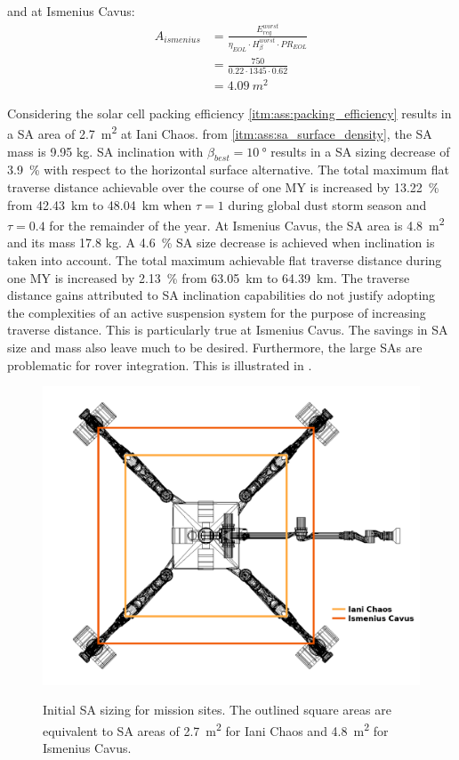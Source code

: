 and at Ismenius Cavus:
\begin{align}
  \label{calc:solar_cell_area_ismenius_cavus_traverse}
  A_{ismenius} &= \frac{E_{req}^{worst}}{\eta_{EOL} \cdot H_{\beta}^{worst} \cdot PR_{EOL}}\\
               &= \frac{750}{0.22 \cdot 1345 \cdot 0.62}\\
               &= \SI{4.09}{m^{2}}
\end{align}

Considering the solar cell packing efficiency \ref{itm:ass:packing_efficiency} results in a \ac{SA} area of \SI{2.7}{m^{2}} at Iani Chaos. from \ref{itm:ass:sa_surface_density}, the \ac{SA} mass is 9.95 \si{\kilo\gram}. \ac{SA} inclination with $\beta_{best} = \SI{10}{\degree}$ results in a \ac{SA} sizing decrease of \SI{3.9}{\percent} with respect to the horizontal surface alternative. The total maximum flat traverse distance achievable over the course of one \ac{MY} is increased by \SI{13.22}{\percent} from \SI{42.43}{\kilo\meter} to \SI{48.04}{\kilo\meter} when $\tau = 1$ during global dust storm season and $\tau = 0.4$ for the remainder of the year. At Ismenius Cavus, the \ac{SA} area is \SI{4.8}{m^{2}} and its mass 17.8 \si{\kilo\gram}. A \SI{4.6}{\percent} \ac{SA} size decrease is achieved when inclination is taken into account. The total maximum achievable flat traverse distance during one \ac{MY} is increased by \SI{2.13}{\percent} from \SI{63.05}{\kilo\meter} to \SI{64.39}{\kilo\meter}. The traverse distance gains attributed to \ac{SA} inclination capabilities do not justify adopting the complexities of an active suspension system for the purpose of increasing traverse distance. This is particularly true at Ismenius Cavus. The savings in \ac{SA} size and mass also leave much to be desired. Furthermore, the large \acp{SA} are problematic for rover integration. This is illustrated in .

\begin{figure}[h]
  \captionsetup[subfigure]{justification=centering}
  \centering
  \hypersetup{linkcolor=captionTextColor}
  \includegraphics[width=0.7\linewidth]{sections/design/solar-array/images/sa-area-initial-sizes.png}\\
  \caption[Initial solar array sizing for mission sites]
          {Initial \ac{SA} sizing for mission sites. The outlined square areas are equivalent to \ac{SA} areas of \SI{2.7}{m^{2}} for Iani Chaos and \SI{4.8}{m^{2}} for Ismenius Cavus.}
  \label{fig:sa-area-initial-sizes}
\end{figure}

